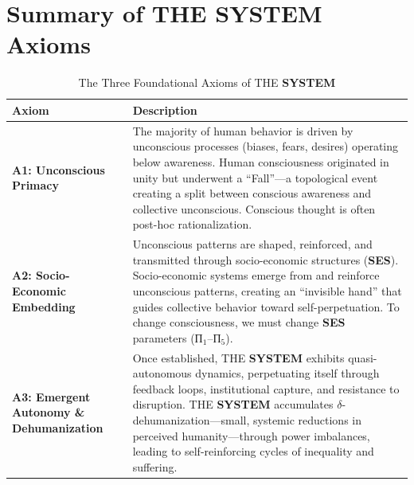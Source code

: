 \documentclass[11pt,a4paper]{article}
\newcommand{\SYSTEM}{\textbf{SYSTEM}}
\newcommand{\SES}{\textbf{SES}}
\newcommand{\deltaDehum}{$\delta$-dehumanization}
\theoremstyle{definition}
\theoremstyle{remark}
\begin{document}
\section{Summary of THE \SYSTEM{} Axioms}
\label{app:axioms}

\begin{table}[H]
\centering
\caption{The Three Foundational Axioms of THE \SYSTEM{}}
\label{tab:system_axioms}
\begin{tabular}{@{}p{}p{}@{}}
\toprule
\textbf{Axiom} & \textbf{Description} \\ \midrule
\textbf{A1: Unconscious Primacy} & The majority of human behavior is driven by unconscious processes (biases, fears, desires) operating below awareness. Human consciousness originated in unity but underwent a ``Fall''---a topological event creating a split between conscious awareness and collective unconscious. Conscious thought is often post-hoc rationalization. \\[0.3cm]
\textbf{A2: Socio-Economic Embedding} & Unconscious patterns are shaped, reinforced, and transmitted through socio-economic structures (\SES{}). Socio-economic systems emerge from and reinforce unconscious patterns, creating an ``invisible hand'' that guides collective behavior toward self-perpetuation. To change consciousness, we must change \SES{} parameters (П$_1$--П$_5$). \\[0.3cm]
\textbf{A3: Emergent Autonomy \& Dehumanization} & Once established, THE \SYSTEM{} exhibits quasi-autonomous dynamics, perpetuating itself through feedback loops, institutional capture, and resistance to disruption. THE \SYSTEM{} accumulates \deltaDehum{}---small, systemic reductions in perceived humanity---through power imbalances, leading to self-reinforcing cycles of inequality and suffering. \\ \bottomrule
\end{tabular}
\end{table}
\end{document}
